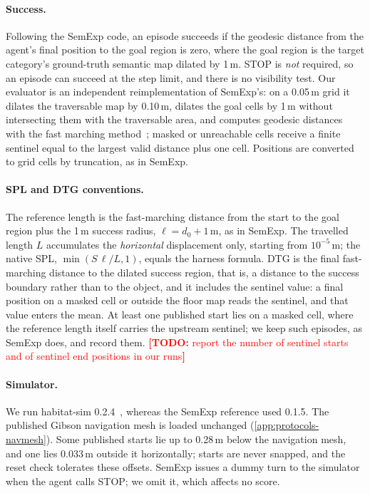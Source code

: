 \documentclass[10pt]{article}
\newcommand{\TODO}[1]{\textcolor{red}{\textbf{[TODO:} #1\textbf{]}}}
\newcommand{\SPL}{\textsc{SPL}\xspace}
\newcommand{\DTG}{\textsc{DTG}\xspace}
\begin{document}
\paragraph{Success.} Following the SemExp code, an episode succeeds if the geodesic distance from the agent's final position to the goal region is zero, where the goal region is the target category's ground-truth semantic map dilated by 1\,m. STOP is \emph{not} required, so an episode can succeed at the step limit, and there is no visibility test. Our evaluator is an independent reimplementation of SemExp's: on a 0.05\,m grid it dilates the traversable map by 0.10\,m, dilates the goal cells by 1\,m without intersecting them with the traversable area, and computes geodesic distances with the fast marching method~\citep{sethian1996fast}; masked or unreachable cells receive a finite sentinel equal to the largest valid distance plus one cell. Positions are converted to grid cells by truncation, as in SemExp.

\paragraph{SPL and DTG conventions.} The reference length is the fast-marching distance from the start to the goal region plus the 1\,m success radius, $\ell = d_0 + 1$\,m, as in SemExp. The travelled length $L$ accumulates the \emph{horizontal} displacement only, starting from $10^{-5}$\,m; the native \SPL, $\min(S\,\ell/L, 1)$, equals the harness formula. \DTG is the final fast-marching distance to the dilated success region, that is, a distance to the success boundary rather than to the object, and it includes the sentinel value: a final position on a masked cell or outside the floor map reads the sentinel, and that value enters the mean. At least one published start lies on a masked cell, where the reference length itself carries the upstream sentinel; we keep such episodes, as SemExp does, and record them. \TODO{report the number of sentinel starts and of sentinel end positions in our runs}

\paragraph{Simulator.} We run habitat-sim 0.2.4~\citep{savva2019habitat}, whereas the SemExp reference used 0.1.5. The published Gibson navigation mesh is loaded unchanged (\cref{app:protocols-navmesh}). Some published starts lie up to 0.28\,m below the navigation mesh, and one lies 0.033\,m outside it horizontally; starts are never snapped, and the reset check tolerates these offsets. SemExp issues a dummy turn to the simulator when the agent calls STOP; we omit it, which affects no score.
\end{document}
